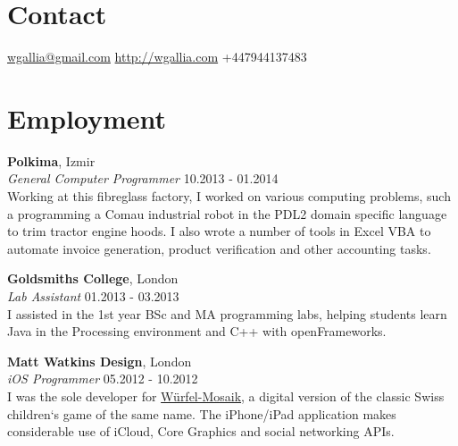 \documentclass[margin,line,a4paper]{resume}
\begin{document}

\begin{resume}

\section{\mysidestyle Contact}

\hypersetup{urlcolor=Fuchsia}
\href{mailto:wgallia@gmail.com}{wgallia@gmail.com} \hfill
\hypersetup{urlcolor=RoyalBlue}
\href{http://wgallia.com}{http://wgallia.com} \hfill
+447944137483 \\


\section{\mysidestyle Employment}

\textbf{Polkima}, Izmir \vspace{1mm}\\
\textsl{General Computer Programmer} \hfill 10.2013 - 01.2014 \vspace{2mm} \\
Working at this fibreglass factory, I worked on various computing
problems, such a programming a Comau industrial robot in the PDL2
domain specific language to trim tractor engine hoods. I also wrote a
number of tools in Excel VBA to automate invoice generation, product
verification and other accounting tasks.

\textbf{Goldsmiths College}, London \vspace{1mm}\\
\textsl{Lab Assistant} \hfill 01.2013 - 03.2013 \vspace{2mm} \\
I assisted in the 1st year BSc and MA programming labs, helping
students learn Java in the Processing environment and C++ with
openFrameworks.

\textbf{Matt Watkins Design}, London \vspace{1mm}\\
\textsl{iOS Programmer} \hfill 05.2012 - 10.2012 \vspace{2mm} \\
I was the sole developer for
\href{http://wurfelmosaik.com/}{W\"{u}rfel-Mosaik}, a digital version
of the classic Swiss children`s game of the same name. The iPhone/iPad
application makes considerable use of iCloud, Core Graphics and social
networking APIs.


\end{resume}
\end{document}
